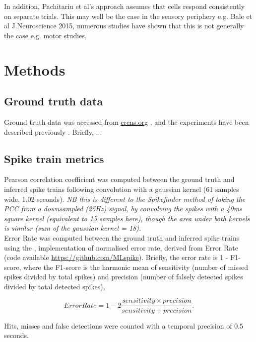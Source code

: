 \documentclass[a4paper,10pt,twocolumn]{article}
\begin{document}
In addition, Pachitariu et al's approach assumes that cells respond consistently on separate trials. This may well be the case in the sensory periphery e.g. Bale et al J.Neuroscience 2015, numerous studies have shown that this is not generally the case e.g. motor studies.


\clearpage
\section{Methods}
\subsection*{Ground truth data}
Ground truth data was accessed from \href{http://crcns.org/data-sets/methods/cai-1}{crcns.org} \citep{Svoboda2015-ym}, and the experiments have been described previously \cite{Chen2013-nv}. Briefly, ...

\subsection*{Spike train metrics}
Pearson correlation coefficient was computed between the ground truth and inferred spike trains following convolution with a gaussian kernel (61 samples wide, 1.02 seconds). \emph{NB this is different to the Spikefinder method of taking the PCC from a downsampled (25Hz) signal, by convolving the spikes with a 40ms square kernel (equivalent to 15 samples here), though the area under both kernels is similar (sum of the gaussian kernel = 18).}\\
Error Rate was computed between the ground truth and inferred spike trains using the \cite{Deneux2016-gu}, implementation of normalised error rate, derived from \cite{Victor1996-cg} Error Rate (code available \href{https://github.com/MLspike}{https://github.com/MLspike}). Briefly, the error rate is 1 - F1-score, where the F1-score is the harmonic mean of sensitivity (number of missed spikes divided by total spikes) and precision (number of falsely detected spikes divided by total detected spikes),

\[Error Rate = 1 - 2 \frac{sensitivity \times precision}{sensitivity + precision}.\]

Hits, misses and false detections were counted with a temporal precision of 0.5 seconds.
\end{document}
